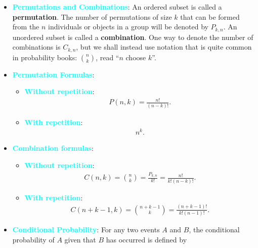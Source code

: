 \documentclass{report}
\begin{document}
\begin{itemize}
        \item \textbf{\textcolor{cyan}{Permutations and Combinations}}:
            An ordered subset is called a \textbf{permutation}. The number of permutations of
            size \( k \) that can be formed from the \( n \) individuals or objects in a group will be
            denoted by \( P_{k,n} \). An unordered subset is called a \textbf{combination}. One way to
            denote the number of combinations is \( C_{k,n} \), but we shall instead use notation
            that is quite common in probability books: \(\binom{n}{k}\), read “\( n \) choose \( k \)”.
        \item \textbf{\textcolor{cyan}{Permutation Formulas}}:
            \begin{itemize}
                \item \textbf{\textcolor{cyan}{Without repetition}}:
                    \begin{align*}
                        P(n, k) = \frac{n!}{(n-k)!}
                    .\end{align*}
                \item \textbf{\textcolor{cyan}{With repetition}}:
                    \begin{align*}
                        n^{k}
                    .\end{align*}
            \end{itemize}
        \item \textbf{\textcolor{cyan}{Combination formulas}}:
            \begin{itemize}
                \item \textbf{\textcolor{cyan}{Without repetition}}:
                    \begin{align*}
                        C(n, k) = \binom{n}{k} = \frac{P_{k,n}}{k!} =  \frac{n!}{k!(n-k)!}
                    .\end{align*}
                \item \textbf{\textcolor{cyan}{With repetition}}:
                    \begin{align*}
                        C(n+k-1, k) = \binom{n+k-1}{k} = \frac{(n+k-1)!}{k!(n-1)!}
                    .\end{align*}
            \end{itemize}
        \item \textbf{\textcolor{cyan}{Conditional Probability}}:
            For any two events \( A \) and \( B \), the conditional probability of \( A \)
            given that \( B \) has occurred is defined by

\end{itemize}
\end{document}
